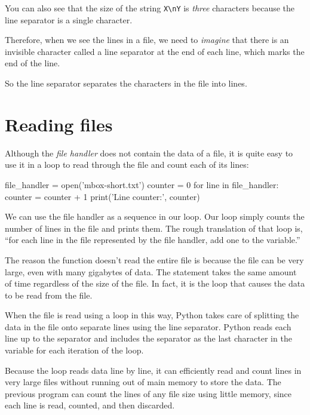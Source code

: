 You can also see that the size of the string \verb|X\nY| is \emph{three} characters because the line separator is a single character.

Therefore, when we see the lines in a file, we need to \emph{imagine} that there is an invisible character called a line separator at the end of each line, which marks the end of the line.

So the line separator separates the characters in the file into lines.

\hypertarget{lectura-de-ficheros}{%
\section{Reading files}\label{lectura-de-ficheros}}

 

Although the \emph{file handler} does not contain the data of a file, it is quite easy to use it in a  loop to read through the file and count each of its lines:

\begin{python}[frame=single]
file_handler = open('mbox-short.txt')
counter = 0
for line in file_handler:
    counter = counter + 1
print('Line counter:', counter)
\end{python}

We can use the file handler as a sequence in our  loop. Our  loop simply counts the number of lines in the file and prints them. The rough translation of that loop is, ``for each line in the file represented by the file handler, add one to the  variable.''

The reason the  function doesn't read the entire file is because the file can be very large, even with many gigabytes of data. The  statement takes the same amount of time regardless of the size of the file. In fact, it is the  loop that causes the data to be read from the file.

When the file is read using a  loop in this way, Python takes care of splitting the data in the file onto separate lines using the line separator. Python reads each line up to the separator and includes the separator as the last character in the variable  for each iteration of the  loop.

Because the  loop reads data line by line, it can efficiently read and count lines in very large files without running out of main memory to store the data. The previous program can count the lines of any file size using little memory, since each line is read, counted, and then discarded.

